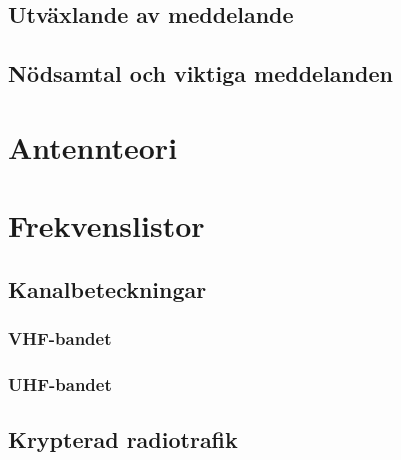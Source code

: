 \documentclass[12ypt,swedish,a4paper]{report}
\begin{document}
\section{Utväxlande av meddelande}

\section{Nödsamtal och viktiga meddelanden}

\chapter{Antennteori}

\chapter{Frekvenslistor}
\label{kap:frekvenslistor}

\section{Kanalbeteckningar}

\subsection{VHF-bandet}

\subsection{UHF-bandet}

\section{Krypterad radiotrafik}

\end{document}
